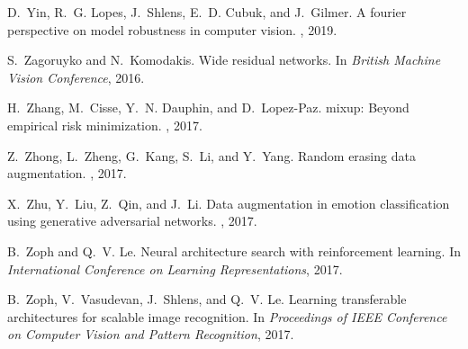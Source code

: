 \documentclass[10pt,twocolumn,letterpaper]{article}
\begin{document}
\begin{thebibliography}{10}
D.~Yin, R.~G. Lopes, J.~Shlens, E.~D. Cubuk, and J.~Gilmer.
\newblock A fourier perspective on model robustness in computer vision.
, 2019.

S.~Zagoruyko and N.~Komodakis.
\newblock Wide residual networks.
\newblock In {\em British Machine Vision Conference}, 2016.

H.~Zhang, M.~Cisse, Y.~N. Dauphin, and D.~Lopez-Paz.
\newblock mixup: Beyond empirical risk minimization.
, 2017.

Z.~Zhong, L.~Zheng, G.~Kang, S.~Li, and Y.~Yang.
\newblock Random erasing data augmentation.
, 2017.

X.~Zhu, Y.~Liu, Z.~Qin, and J.~Li.
\newblock Data augmentation in emotion classification using generative
  adversarial networks.
, 2017.

B.~Zoph and Q.~V. Le.
\newblock Neural architecture search with reinforcement learning.
\newblock In {\em International Conference on Learning Representations}, 2017.

B.~Zoph, V.~Vasudevan, J.~Shlens, and Q.~V. Le.
\newblock Learning transferable architectures for scalable image recognition.
\newblock In {\em Proceedings of IEEE Conference on Computer Vision and Pattern
  Recognition}, 2017.

\end{thebibliography}
 \clearpage
\appendix
\end{document}
